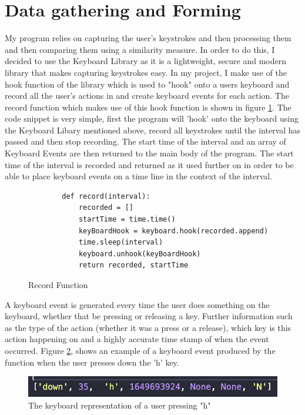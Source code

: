 \documentclass[10pt,a4paper]{report}
\begin{document}
\section{Data gathering and Forming}
My program relies on capturing the user's keystrokes and then processing them and then comparing them using a similarity measure. In order to do this, I decided to use the Keyboard Library\cite{boppreh_2016} as it is a lightweight, secure and modern library that makes capturing keystrokes easy. In my project, I make use of the hook function of the library which is used to "hook" onto a users keyboard and record all the user's actions in and create keyboard events for each action. The record function which makes use of this hook function is shown in figure \ref{fig:Record}. The code snippet is very simple, first the program will 'hook' onto the keyboard using the Keyboard Libary mentioned above, record all keystrokes until the interval has passed and then stop recording. The start time of the interval and an array of Keyboard Events are then returned to the main body of the program. The start time of the interval is recorded and returned as it used further on in order to be able to place keyboard events on a time line in the context of the interval.

\begin{figure}[h!]
	\begin{lstlisting}
		def record(interval):
    		recorded = []
    		startTime = time.time()
    		keyBoardHook = keyboard.hook(recorded.append)
    		time.sleep(interval)
    		keyboard.unhook(keyBoardHook)
    		return recorded, startTime
	\end{lstlisting}
	\caption{Record Function}
	\label{fig:Record}
\end{figure}

A keyboard event is generated every time the user does something on the keyboard, whether that be pressing or releasing a key. Further information such as the type of the action (whether it was a press or a release), which key is this action happening on and a highly accurate time stamp of when the event occurred. Figure \ref{fig:Hook}, shows an example of a keyboard event produced by the function when the user presses down the 'h' key.

\begin{figure}[h]
\centering
\includegraphics[scale=0.97]{KeyboardEvent}
\caption{The keyboard representation of a user pressing "h"}
\label{fig:Hook}
\end{figure}	
\end{document}
